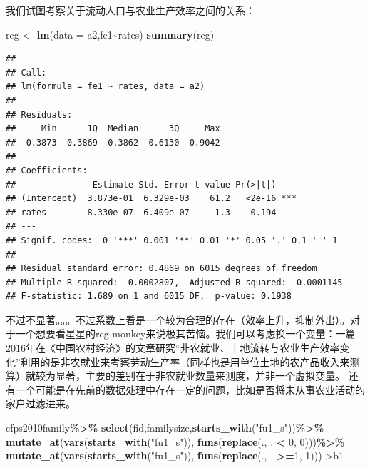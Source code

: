 \documentclass[
]{book}
\newenvironment{Shaded}{\begin{snugshade}}{\end{snugshade}}
\newcommand{\AttributeTok}[1]{\textcolor[rgb]{0.13,0.29,0.53}{#1}}
\newcommand{\DecValTok}[1]{\textcolor[rgb]{0.00,0.00,0.81}{#1}}
\newcommand{\FunctionTok}[1]{\textcolor[rgb]{0.13,0.29,0.53}{\textbf{#1}}}
\newcommand{\NormalTok}[1]{#1}
\newcommand{\OtherTok}[1]{\textcolor[rgb]{0.56,0.35,0.01}{#1}}
\newcommand{\SpecialCharTok}[1]{\textcolor[rgb]{0.81,0.36,0.00}{\textbf{#1}}}
\newcommand{\StringTok}[1]{\textcolor[rgb]{0.31,0.60,0.02}{#1}}
\begin{document}
我们试图考察关于流动人口与农业生产效率之间的关系：

\begin{Shaded}
\begin{Highlighting}[]
\NormalTok{reg }\OtherTok{\textless{}{-}} \FunctionTok{lm}\NormalTok{(}\AttributeTok{data =}\NormalTok{ a2,fe1}\SpecialCharTok{\textasciitilde{}}\NormalTok{rates)}
\FunctionTok{summary}\NormalTok{(reg)}
\end{Highlighting}
\end{Shaded}

\begin{verbatim}
## 
## Call:
## lm(formula = fe1 ~ rates, data = a2)
## 
## Residuals:
##     Min      1Q  Median      3Q     Max 
## -0.3873 -0.3869 -0.3862  0.6130  0.9042 
## 
## Coefficients:
##               Estimate Std. Error t value Pr(>|t|)    
## (Intercept)  3.873e-01  6.329e-03    61.2   <2e-16 ***
## rates       -8.330e-07  6.409e-07    -1.3    0.194    
## ---
## Signif. codes:  0 '***' 0.001 '**' 0.01 '*' 0.05 '.' 0.1 ' ' 1
## 
## Residual standard error: 0.4869 on 6015 degrees of freedom
## Multiple R-squared:  0.0002807,  Adjusted R-squared:  0.0001145 
## F-statistic: 1.689 on 1 and 6015 DF,  p-value: 0.1938
\end{verbatim}

不过不显著。。。不过系数上看是一个较为合理的存在（效率上升，抑制外出）。对于一个想要看星星的reg monkey来说极其苦恼。我们可以考虑换一个变量：一篇2016年在《中国农村经济》的文章研究``非农就业、土地流转与农业生产效率变化''利用的是非农就业来考察劳动生产率（同样也是用单位土地的农产品收入来测算）就较为显著，主要的差别在于非农就业数量来测度，并非一个虚拟变量。
还有一个可能是在先前的数据处理中存在一定的问题，比如是否将未从事农业活动的家户过滤进来。

\begin{Shaded}
\begin{Highlighting}[]
\NormalTok{cfps2010family}\SpecialCharTok{\%\textgreater{}\%}
  \FunctionTok{select}\NormalTok{(fid,familysize,}\FunctionTok{starts\_with}\NormalTok{(}\StringTok{"fu1\_s"}\NormalTok{))}\SpecialCharTok{\%\textgreater{}\%}
  \FunctionTok{mutate\_at}\NormalTok{(}\FunctionTok{vars}\NormalTok{(}\FunctionTok{starts\_with}\NormalTok{(}\StringTok{"fu1\_s"}\NormalTok{)), }\FunctionTok{funs}\NormalTok{(}\FunctionTok{replace}\NormalTok{(., . }\SpecialCharTok{\textless{}} \DecValTok{0}\NormalTok{, }\DecValTok{0}\NormalTok{)))}\SpecialCharTok{\%\textgreater{}\%}
  \FunctionTok{mutate\_at}\NormalTok{(}\FunctionTok{vars}\NormalTok{(}\FunctionTok{starts\_with}\NormalTok{(}\StringTok{"fu1\_s"}\NormalTok{)), }\FunctionTok{funs}\NormalTok{(}\FunctionTok{replace}\NormalTok{(., . }\SpecialCharTok{\textgreater{}=}\DecValTok{1}\NormalTok{, }\DecValTok{1}\NormalTok{)))}\OtherTok{{-}\textgreater{}}\NormalTok{b1}
\end{Highlighting}
\end{Shaded}
\end{document}
